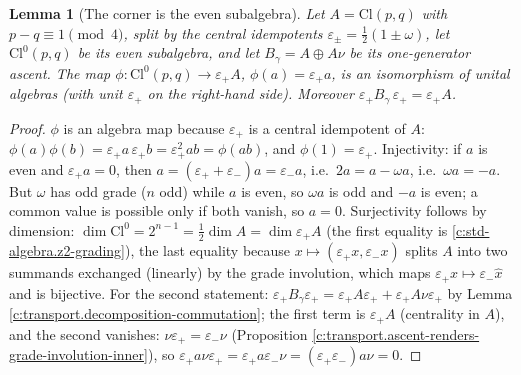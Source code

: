 \documentclass[11pt]{article}
\newtheorem{lemma}[theorem]{Lemma}
\theoremstyle{definition}
\theoremstyle{plain}
\newcommand{\changedmark}[2]{\marginpar{\raggedright\scriptsize\color{#1}#2}}
\providecommand{\Cl}{}\renewcommand{\Cl}{\mathrm{Cl}}
\begin{document}
\begin{lemma}[The corner is the even subalgebra]\label{c:transport.corner-even-subalgebra}
\changedmark{BurntOrange}{changed since the deposit}
Let $A = \Cl(p,q)$ with $p - q \equiv 1 \pmod 4$, split by the central idempotents $\varepsilon_\pm = \tfrac12(1 \pm \omega)$, let $\Cl^0(p,q)$ be its even subalgebra, and let $B_\gamma = A \oplus A\nu$ be its one-generator ascent. The map $\phi : \Cl^0(p,q) \to \varepsilon_+ A$, $\phi(a) = \varepsilon_+ a$, is an isomorphism of unital algebras (with unit $\varepsilon_+$ on the right-hand side). Moreover $\varepsilon_+ B_\gamma\, \varepsilon_+ = \varepsilon_+ A$.
\end{lemma}
\begin{proof}
$\phi$ is an algebra map because $\varepsilon_+$ is a central idempotent of $A$: $\phi(a)\phi(b) = \varepsilon_+ a\, \varepsilon_+ b = \varepsilon_+^2 ab = \phi(ab)$, and $\phi(1) = \varepsilon_+$. Injectivity: if $a$ is even and $\varepsilon_+ a = 0$, then $a = (\varepsilon_+ + \varepsilon_-)a = \varepsilon_- a$, i.e.\ $2a = a - \omega a$, i.e.\ $\omega a = -a$. But $\omega$ has odd grade ($n$ odd) while $a$ is even, so $\omega a$ is odd and $-a$ is even; a common value is possible only if both vanish, so $a = 0$. Surjectivity follows by dimension: $\dim \Cl^0 = 2^{n-1} = \tfrac12 \dim A = \dim \varepsilon_+ A$ (the first equality is \ref{c:std-algebra.z2-grading}), the last equality because $x \mapsto (\varepsilon_+ x, \varepsilon_- x)$ splits $A$ into two summands exchanged (linearly) by the grade involution, which maps $\varepsilon_+ x \mapsto \varepsilon_- \hat{x}$ and is bijective. For the second statement: $\varepsilon_+ B_\gamma \varepsilon_+ = \varepsilon_+ A \varepsilon_+ + \varepsilon_+ A \nu \varepsilon_+$ by Lemma \ref{c:transport.decomposition-commutation}; the first term is $\varepsilon_+ A$ (centrality in $A$), and the second vanishes: $\nu \varepsilon_+ = \varepsilon_- \nu$ (Proposition \ref{c:transport.ascent-renders-grade-involution-inner}), so $\varepsilon_+ a \nu \varepsilon_+ = \varepsilon_+ a \varepsilon_- \nu = (\varepsilon_+ \varepsilon_-) a \nu = 0$.

\end{proof}
\end{document}
